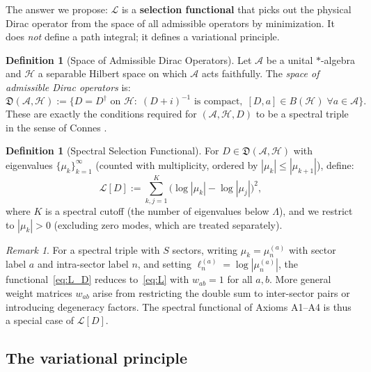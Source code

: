 \documentclass[12pt]{article}
\theoremstyle{definition}
\newtheorem{definition}[theorem]{Definition}
\theoremstyle{remark}
\newtheorem{remark}[theorem]{Remark}
\begin{document}
The answer we propose: $\mathcal{L}$ is a \textbf{selection functional}
that picks out the physical Dirac operator from the space of all
admissible operators by minimization.  It does \emph{not} define a
path integral; it defines a variational principle.

\begin{definition}[Space of Admissible Dirac Operators]\label{def:admissible}
Let $\mathcal{A}$ be a unital $*$-algebra and $\mathcal{H}$ a separable
Hilbert space on which $\mathcal{A}$ acts faithfully.
The \emph{space of admissible Dirac operators} is:
\begin{equation}\label{eq:Dadm}
  \mathfrak{D}(\mathcal{A},\mathcal{H})
  := \bigl\{D = D^\dagger \text{ on } \mathcal{H}
     :\; (D+i)^{-1} \text{ is compact},\;
     [D,a] \in B(\mathcal{H})\;\forall a \in \mathcal{A}\bigr\}.
\end{equation}
These are exactly the conditions required for $(\mathcal{A},\mathcal{H},D)$
to be a spectral triple in the sense of Connes \cite{Connes1994}.
\end{definition}

\begin{definition}[Spectral Selection Functional]\label{def:selection}
For $D \in \mathfrak{D}(\mathcal{A},\mathcal{H})$ with eigenvalues
$\{\mu_k\}_{k=1}^\infty$ (counted with multiplicity, ordered by
$|\mu_k| \leq |\mu_{k+1}|$), define:
\begin{equation}\label{eq:L_D}
  \mathcal{L}[D]
  := \sum_{k,j=1}^{K}
     \bigl(\log|\mu_k| - \log|\mu_j|\bigr)^2,
\end{equation}
where $K$ is a spectral cutoff (the number of eigenvalues below
$\Lambda$), and we restrict to $|\mu_k| > 0$
(excluding zero modes, which are treated separately).
\end{definition}

\begin{remark}\label{rem:match}
For a spectral triple with $S$ sectors, writing $\mu_k = \mu_n^{(a)}$
with sector label $a$ and intra-sector label $n$, and setting
$\ell_n^{(a)} = \log|\mu_n^{(a)}|$, the functional~\eqref{eq:L_D}
reduces to~\eqref{eq:L} with $w_{ab} = 1$ for all $a,b$.
More general weight matrices $w_{ab}$ arise from restricting the
double sum to inter-sector pairs or introducing degeneracy factors.
The spectral functional of Axioms A1--A4 is thus a special case
of $\mathcal{L}[D]$.
\end{remark}

\subsection{The variational principle}
\end{document}
